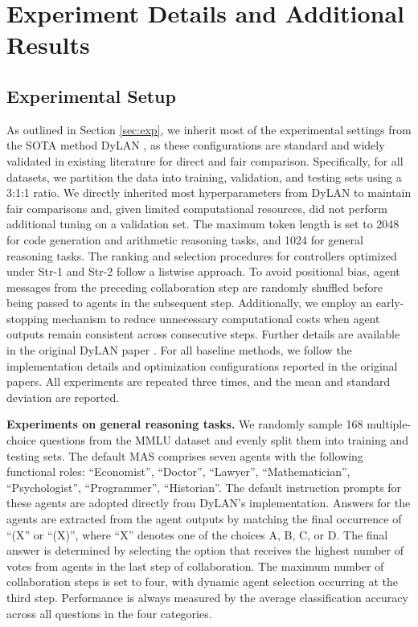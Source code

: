 


\section{Experiment Details and Additional Results}\label{sec:expdetail}


\subsection{Experimental Setup}\label{sec:exp_setup}


As outlined in Section \ref{sec:exp}, we inherit most of the experimental settings from the SOTA method DyLAN \cite{dylan}, as these configurations are standard and widely validated in existing literature for direct and fair comparison.
Specifically, for all datasets, we partition the data into training, validation, and testing sets using a 3:1:1 ratio. We directly inherited most hyperparameters from DyLAN to maintain fair comparisons and, given limited computational resources, did not perform additional tuning on a validation set. The maximum token length is set to 2048 for code generation and arithmetic reasoning tasks, and 1024 for general reasoning tasks. The ranking and selection procedures for controllers optimized under Str-1 and Str-2 follow a listwise approach. To avoid positional bias, agent messages from the preceding collaboration step are randomly shuffled before being passed to agents in the subsequent step. Additionally, we employ an early-stopping mechanism to reduce unnecessary computational costs when agent outputs remain consistent across consecutive steps. Further details are available in the original DyLAN paper \cite{dylan}. For all baseline methods, we follow the implementation details and optimization configurations reported in the original papers.
All experiments are repeated three times, and the mean and standard deviation are reported.

\noindent \textbf{Experiments on general reasoning tasks.} We randomly sample 168 multiple-choice questions from the MMLU dataset \cite{mmlu} and evenly split them into training and testing sets.
The default MAS comprises seven agents with the following functional roles: ``Economist'', ``Doctor'', ``Lawyer'', ``Mathematician'', ``Psychologist'', ``Programmer'', ``Historian''. The default instruction prompts for these agents are adopted directly from DyLAN’s implementation. Answers for the agents are extracted from the agent outputs by matching the final occurrence of ``(X'' or ``(X)'', where ``X'' denotes one of the choices A, B, C, or D. The final answer is determined by selecting the option that receives the highest number of votes from agents in the last step of collaboration. The maximum number of collaboration steps is set to four, with dynamic agent selection occurring at the third step. Performance is always measured by the average classification accuracy across all questions in the four categories.



